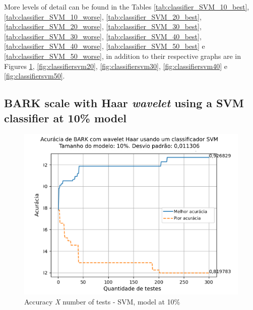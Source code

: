 \par More levels of detail can be found in the Tables
 \ref{tab:classifier_SVM_10_best}, \ref{tab:classifier_SVM_10_worse}, \ref{tab:classifier_SVM_20_best}, \ref{tab:classifier_SVM_20_worse}, \ref{tab:classifier_SVM_30_best}, \ref{tab:classifier_SVM_30_worse}, \ref{tab:classifier_SVM_40_best}, \ref{tab:classifier_SVM_40_worse}, \ref{tab:classifier_SVM_50_best} e \ref{tab:classifier_SVM_50_worse}, in addition to their respective graphs are in Figures \ref{fig:classifiersvm10}, \ref{fig:classifiersvm20}, \ref{fig:classifiersvm30}, \ref{fig:classifiersvm40} e \ref{fig:classifiersvm50}.



\subsection{BARK scale with Haar \textit{wavelet} using a SVM classifier at 10\% model}



\begin{figure}[H]
	\centering
	\includegraphics[width=.8\linewidth]{images/results/confusionMatrices/classifier_SVM_10.png}
	\caption{Accuracy \textit{X} number of tests - SVM, model at 10\%}
	\label{fig:classifiersvm10}
\end{figure}

